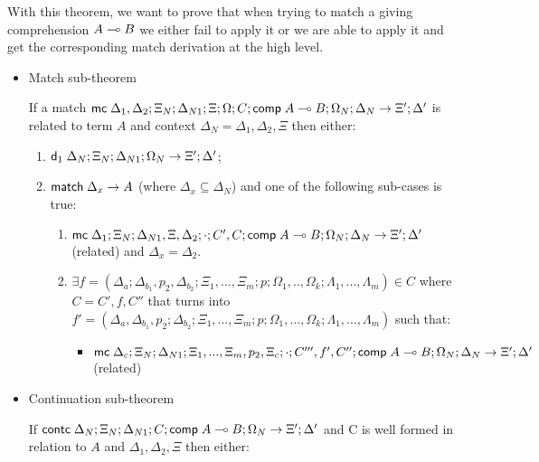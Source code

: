 With this theorem, we want to prove that when trying to match a giving comprehension $A \multimap B$ we either fail to apply it or we are able to apply it and get the corresponding match derivation at the high level.

\begin{theorem}
   
\begin{itemize}
   \item Match sub-theorem

If a match $\mathsf{mc} \; \Delta_1, \Delta_2; \Xi_N; \Delta_{N1}; \Xi; \Omega; C; \mathsf{comp} \; A \multimap B; \Omega_N; \Delta_N \rightarrow \Xi'; \Delta'$ is related to term $A$ and context $\Delta_{N} = \Delta_1, \Delta_2, \Xi$ then either:

\begin{enumerate}
   \item $\mathsf{d}_1 \; \Delta_N; \Xi_N; \Delta_{N1}; \Omega_N \rightarrow \Xi'; \Delta'$;
   \item $\mathsf{match} \; \Delta_x \rightarrow A$ (where $\Delta_x \subseteq \Delta_N$) and one of the following sub-cases is true:
   
      \begin{enumerate}
         \item $\mathsf{mc} \; \Delta_1; \Xi_N; \Delta_{N1}, \Xi, \Delta_2; \cdot; C', C; \mathsf{comp} \; A \multimap B; \Omega_N; \Delta_N \rightarrow \Xi'; \Delta'$ (related) and $\Delta_x = \Delta_2$.
         \item $\exists f = (\Delta_a; \Delta_{b_1}, p_2, \Delta_{b_2}; \Xi_1, ..., \Xi_m; p; \Omega_1, .., \Omega_k; \Lambda_1, ..., \Lambda_m) \in C$ where $C= C', f, C''$ that turns into $f' = (\Delta_a, \Delta_{b_1}, p_2; \Delta_{b_2}; \Xi_1, ..., \Xi_m; p; \Omega_1, ..., \Omega_k; \Lambda_1, ..., \Lambda_m)$ such that:
         \begin{itemize}
            \item $\mathsf{mc} \; \Delta_c; \Xi_N; \Delta_{N1}; \Xi_1, ..., \Xi_m, p_2, \Xi_c; \cdot; C''', f', C''; \mathsf{comp} \; A \multimap B; \Omega_N; \Delta_N \rightarrow \Xi'; \Delta'$ (related)
         \end{itemize}
      \end{enumerate}
\end{enumerate}

\item Continuation sub-theorem

If $\mathsf{contc} \; \Delta_N; \Xi_N; \Delta_{N1}; C; \mathsf{comp} \; A \multimap B; \Omega_N \rightarrow \Xi'; \Delta'$ and C is well formed in relation to $A$ and $\Delta_1, \Delta_2, \Xi$ then either:


\end{itemize}
\end{theorem}
